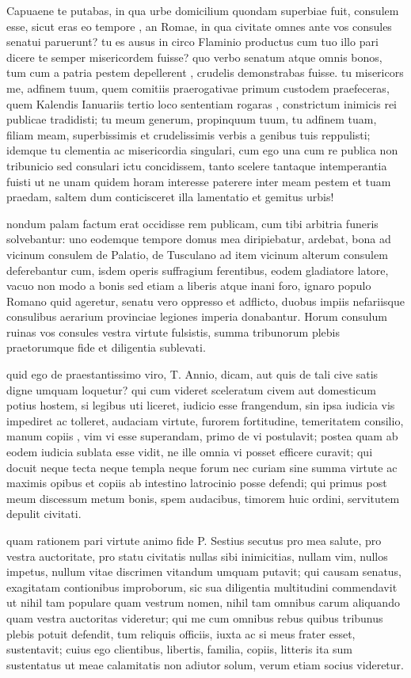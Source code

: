  Capuaene te putabas, in qua urbe domicilium quondam superbiae fuit, consulem esse, sicut eras eo tempore , an Romae, in qua civitate omnes ante vos consules senatui paruerunt? tu es ausus in circo Flaminio productus cum tuo illo pari dicere te semper misericordem fuisse? quo verbo senatum atque omnis bonos, tum cum a patria pestem depellerent , crudelis demonstrabas fuisse. tu misericors me, adfinem tuum, quem comitiis praerogativae primum custodem praefeceras, quem Kalendis Ianuariis tertio loco sententiam rogaras , constrictum inimicis rei publicae tradidisti; tu meum generum, propinquum tuum, tu adfinem tuam, filiam meam, superbissimis et crudelissimis verbis a genibus tuis reppulisti; idemque tu clementia ac misericordia singulari, cum ego una cum re publica non tribunicio sed consulari ictu concidissem, tanto scelere tantaque intemperantia fuisti ut ne unam quidem horam interesse paterere inter meam pestem et tuam praedam, saltem dum conticisceret illa lamentatio et gemitus urbis!

 nondum palam factum erat occidisse rem publicam, cum tibi arbitria funeris solvebantur: uno eodemque tempore domus mea diripiebatur, ardebat, bona ad vicinum consulem de Palatio, de Tusculano ad item vicinum alterum consulem deferebantur cum, isdem operis suffragium ferentibus, eodem gladiatore latore, vacuo non modo a bonis sed etiam a liberis atque inani foro, ignaro populo Romano quid ageretur, senatu vero oppresso et adflicto, duobus impiis nefariisque consulibus aerarium provinciae legiones imperia donabantur. Horum consulum ruinas vos consules vestra virtute fulsistis, summa tribunorum plebis praetorumque fide et diligentia sublevati.

 quid ego de praestantissimo viro, T. Annio, dicam, aut quis de tali cive satis digne umquam loquetur? qui cum videret sceleratum civem aut domesticum potius hostem, si legibus uti liceret, iudicio esse frangendum, sin ipsa iudicia vis impediret ac tolleret, audaciam virtute, furorem fortitudine, temeritatem consilio, manum copiis , vim vi esse superandam, primo de vi postulavit; postea quam ab eodem iudicia sublata esse vidit, ne ille omnia vi posset efficere curavit; qui docuit neque tecta neque templa neque forum nec curiam sine summa virtute ac maximis opibus et copiis ab intestino latrocinio posse defendi; qui primus post meum discessum metum bonis, spem audacibus, timorem huic ordini, servitutem depulit civitati.

 quam rationem pari virtute animo fide P. Sestius secutus pro mea salute, pro vestra auctoritate, pro statu civitatis nullas sibi inimicitias, nullam vim, nullos impetus, nullum vitae discrimen vitandum umquam putavit; qui causam senatus, exagitatam contionibus improborum, sic sua diligentia multitudini commendavit ut nihil tam populare quam vestrum nomen, nihil tam omnibus carum aliquando quam vestra auctoritas videretur; qui me cum omnibus rebus quibus tribunus plebis potuit defendit, tum reliquis officiis, iuxta ac si meus frater esset, sustentavit; cuius ego clientibus, libertis, familia, copiis, litteris ita sum sustentatus ut meae calamitatis non adiutor solum, verum etiam socius videretur.

